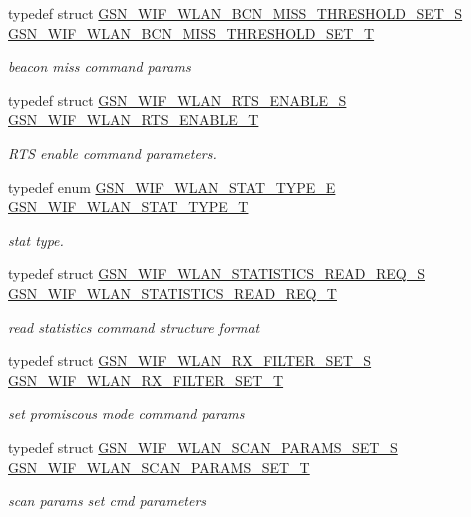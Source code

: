 \begin{DoxyCompactItemize}
\item 
typedef struct \hyperlink{a00372}{GSN\_\-WIF\_\-WLAN\_\-BCN\_\-MISS\_\-THRESHOLD\_\-SET\_\-S} \hyperlink{a00677_ga3804a62776c49cf6cd5522262eb81695}{GSN\_\-WIF\_\-WLAN\_\-BCN\_\-MISS\_\-THRESHOLD\_\-SET\_\-T}
\begin{DoxyCompactList}\small\item\em beacon miss command params \end{DoxyCompactList}\item 
typedef struct \hyperlink{a00396}{GSN\_\-WIF\_\-WLAN\_\-RTS\_\-ENABLE\_\-S} \hyperlink{a00677_ga7629340b77de2ac1d56c6aa8c8013d47}{GSN\_\-WIF\_\-WLAN\_\-RTS\_\-ENABLE\_\-T}
\begin{DoxyCompactList}\small\item\em RTS enable command parameters. \end{DoxyCompactList}\item 
typedef enum \hyperlink{a00677_ga1ea7ef2124a3ae886d909d6b8188ef79}{GSN\_\-WIF\_\-WLAN\_\-STAT\_\-TYPE\_\-E} \hyperlink{a00677_ga64d9749befbab903d13eae1c816e40cf}{GSN\_\-WIF\_\-WLAN\_\-STAT\_\-TYPE\_\-T}
\begin{DoxyCompactList}\small\item\em stat type. \end{DoxyCompactList}\item 
typedef struct \hyperlink{a00406}{GSN\_\-WIF\_\-WLAN\_\-STATISTICS\_\-READ\_\-REQ\_\-S} \hyperlink{a00677_ga0532c6cda31388631d8d6346390ac764}{GSN\_\-WIF\_\-WLAN\_\-STATISTICS\_\-READ\_\-REQ\_\-T}
\begin{DoxyCompactList}\small\item\em read statistics command structure format \end{DoxyCompactList}\item 
typedef struct \hyperlink{a00397}{GSN\_\-WIF\_\-WLAN\_\-RX\_\-FILTER\_\-SET\_\-S} \hyperlink{a00677_gad632a83292610148499e14031b507f4b}{GSN\_\-WIF\_\-WLAN\_\-RX\_\-FILTER\_\-SET\_\-T}
\begin{DoxyCompactList}\small\item\em set promiscous mode command params \end{DoxyCompactList}\item 
typedef struct \hyperlink{a00401}{GSN\_\-WIF\_\-WLAN\_\-SCAN\_\-PARAMS\_\-SET\_\-S} \hyperlink{a00677_ga38fb363f219070729c31798116e9702c}{GSN\_\-WIF\_\-WLAN\_\-SCAN\_\-PARAMS\_\-SET\_\-T}
\begin{DoxyCompactList}\small\item\em scan params set cmd parameters \end{DoxyCompactList}\item 

\end{DoxyCompactItemize}
